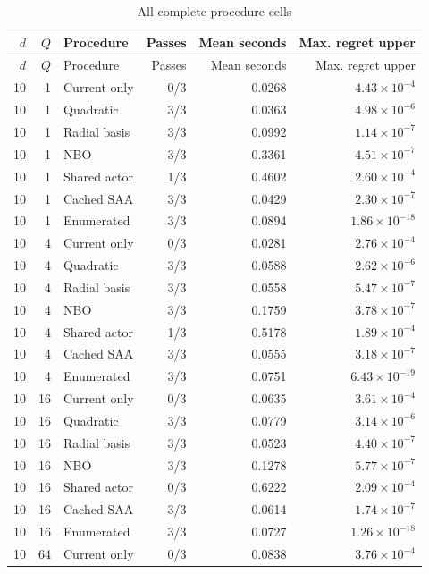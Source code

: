 \begin{longtable}{rrlrrr}
\caption{All complete procedure cells}\label{tab:r19allcells}\\
\toprule $d$ & $Q$ & Procedure & Passes & Mean seconds & Max. regret upper\\\midrule
\endfirsthead
\toprule $d$ & $Q$ & Procedure & Passes & Mean seconds & Max. regret upper\\\midrule
\endhead
10 & 1 & Current only & 0/3 & 0.0268 & $4.43\times10^{-4}$\\
10 & 1 & Quadratic & 3/3 & 0.0363 & $4.98\times10^{-6}$\\
10 & 1 & Radial basis & 3/3 & 0.0992 & $1.14\times10^{-7}$\\
10 & 1 & NBO & 3/3 & 0.3361 & $4.51\times10^{-7}$\\
10 & 1 & Shared actor & 1/3 & 0.4602 & $2.60\times10^{-4}$\\
10 & 1 & Cached SAA & 3/3 & 0.0429 & $2.30\times10^{-7}$\\
10 & 1 & Enumerated & 3/3 & 0.0894 & $1.86\times10^{-18}$\\
10 & 4 & Current only & 0/3 & 0.0281 & $2.76\times10^{-4}$\\
10 & 4 & Quadratic & 3/3 & 0.0588 & $2.62\times10^{-6}$\\
10 & 4 & Radial basis & 3/3 & 0.0558 & $5.47\times10^{-7}$\\
10 & 4 & NBO & 3/3 & 0.1759 & $3.78\times10^{-7}$\\
10 & 4 & Shared actor & 1/3 & 0.5178 & $1.89\times10^{-4}$\\
10 & 4 & Cached SAA & 3/3 & 0.0555 & $3.18\times10^{-7}$\\
10 & 4 & Enumerated & 3/3 & 0.0751 & $6.43\times10^{-19}$\\
10 & 16 & Current only & 0/3 & 0.0635 & $3.61\times10^{-4}$\\
10 & 16 & Quadratic & 3/3 & 0.0779 & $3.14\times10^{-6}$\\
10 & 16 & Radial basis & 3/3 & 0.0523 & $4.40\times10^{-7}$\\
10 & 16 & NBO & 3/3 & 0.1278 & $5.77\times10^{-7}$\\
10 & 16 & Shared actor & 0/3 & 0.6222 & $2.09\times10^{-4}$\\
10 & 16 & Cached SAA & 3/3 & 0.0614 & $1.74\times10^{-7}$\\
10 & 16 & Enumerated & 3/3 & 0.0727 & $1.26\times10^{-18}$\\
10 & 64 & Current only & 0/3 & 0.0838 & $3.76\times10^{-4}$\\

\end{longtable}

